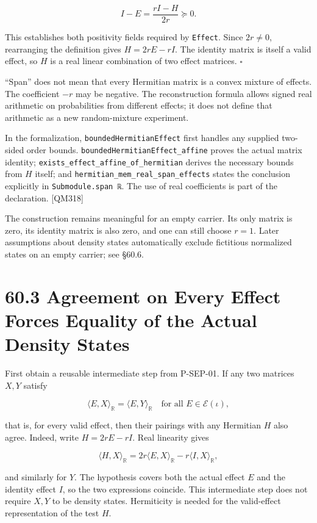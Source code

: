 \documentclass[
  11pt,
  oneside]{book}
\begin{document}
\[
I-E=\frac{rI-H}{2r}\succeq0.
\]

This establishes both positivity fields required by \texttt{Effect}.
Since \(2r\ne0\), rearranging the definition gives \(H=2rE-rI\). The
identity matrix is itself a valid effect, so \(H\) is a real linear
combination of two effect matrices. \(\square\)

``Span'' does not mean that every Hermitian matrix is a convex mixture
of effects. The coefficient \(-r\) may be negative. The reconstruction
formula allows signed real arithmetic on probabilities from different
effects; it does not define that arithmetic as a new random-mixture
experiment.

In the formalization, \texttt{bounded\allowbreak Hermitian\allowbreak Effect} first handles any
supplied two-sided order bounds. \texttt{bounded\allowbreak Hermitian\allowbreak Effect\_\allowbreak affine}
proves the actual matrix identity;
\texttt{exists\_\allowbreak effect\_\allowbreak affine\_\allowbreak of\_\allowbreak hermitian} derives the necessary
bounds from \(H\) itself; and
\texttt{hermitian\_\allowbreak mem\_\allowbreak real\_\allowbreak span\_\allowbreak effects} states the conclusion
explicitly in \texttt{Submodule.\allowbreak span\ ℝ}. The use of real coefficients
is part of the declaration. {[}QM318{]}

The construction remains meaningful for an empty carrier. Its only
matrix is zero, its identity matrix is also zero, and one can still
choose \(r=1\). Later assumptions about density states automatically
exclude fictitious normalized states on an empty carrier; see §60.6.

\section{60.3 Agreement on Every Effect Forces Equality of the Actual
Density States}

First obtain a reusable intermediate step from P-SEP-01. If any two
matrices \(X,Y\) satisfy

\[
\langle E,X\rangle_{\mathbb R}
=\langle E,Y\rangle_{\mathbb R}
\quad\text{for all }E\in\mathcal E(\iota),
\]

that is, for every valid effect, then their pairings with any Hermitian
\(H\) also agree. Indeed, write \(H=2rE-rI\). Real linearity gives

\[
\langle H,X\rangle_{\mathbb R}
=2r\langle E,X\rangle_{\mathbb R}
-r\langle I,X\rangle_{\mathbb R},
\]

and similarly for \(Y\). The hypothesis covers both the actual effect
\(E\) and the identity effect \(I\), so the two expressions coincide.
This intermediate step does not require \(X,Y\) to be density states.
Hermiticity is needed for the valid-effect representation of the test
\(H\).
\end{document}
